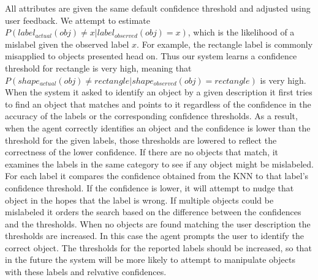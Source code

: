 \documentclass[11pt]{article}
\begin{document}
All attributes are given the same default confidence threshold and adjusted
using user feedback. We attempt to estimate $P(label_{actual}(obj) \neq x | label_{observed}(obj) = x)$, which is the likelihood of a mislabel given the observed label $x$. For example, the rectangle label is commonly misapplied to objects presented head on. Thus our system learns a confidence threshold for rectangle is very high, meaning that $P(shape_{actual}(obj) \neq rectangle|shape_{observed}(obj) = rectangle)$ is very high. When the system it asked to identify an object by a given description it first tries to find an object that matches and points to it regardless of the confidence in the accuracy of the labels or the corresponding confidence thresholds. As a result, when the agent correctly identifies an object and the confidence is lower than the threshold for the given labels, those thresholds are lowered to reflect the correctness of the lower confidence. If there are no objects that match, it examines the labels in the same category to see if any object might be mislabeled. For each label it compares the confidence obtained from the KNN to that label's confidence threshold. If the confidence is lower, it will attempt to nudge that object in the hopes that the label is wrong. If multiple objects could be mislabeled it orders the search based on the difference between the confidences and the thresholds. When no objects are found matching the user description the thresholds are increased. In this case the agent prompts the user to identify the correct object. The thresholds for the reported labels should be increased, so that in the future the system will be more likely to attempt to manipulate objects with these labels and relvative confidences.
\end{document}
